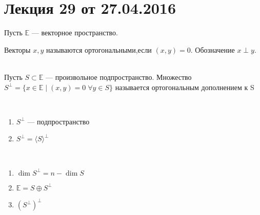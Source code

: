 


\renewcommand{\f}{\mathbb{f}}
\newcommand{\ort}{\mathrm{ort}}
\renewcommand{\Pr}{\mathrm{Pr}}

\section{Лекция 29 от 27.04.2016}
Пусть $\mathbb{E}$ --- векторное пространство.
\begin{Def}
	Векторы $x,y$ называются ортогональными,если $(x,y)=0$. Обозначение $x\perp y$. 
\end{Def}
\begin{Def}
	\ \\
	Пусть $S \subset \mathbb{E}$ --- произвольное подпространство. Множество $S^{\perp} = \{x\in \mathbb{E}\; |\; (x,y) = 0\;\forall y \in S\}$ называется ортогональным дополнением к S
\end{Def}
\begin{Comment}
	\ 
	\begin{enumerate}
		\item $S^\perp$ --- подпространство
		\item $S^\perp = \langle S \rangle^\perp$
	\end{enumerate}
\end{Comment}
\begin{Suggestion}
	\ 
	\begin{enumerate}
		\item $\dim S^\perp = n - \dim S$
		\item $\mathbb{E} = S \oplus S^\perp$
		\item $(S^\perp)^\perp$
	\end{enumerate}
\end{Suggestion}

